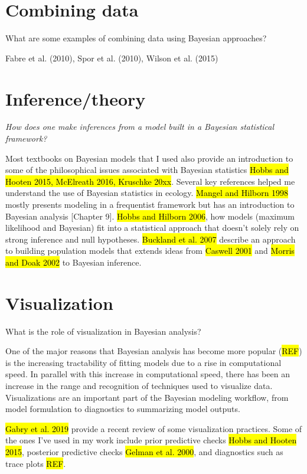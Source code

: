 \documentclass[12pt, oneside, titlepage]{article}   	%
\begin{document}
\section*{Combining data}

What are some examples of combining data using Bayesian approaches?

Fabre et al. (2010), Spor et al. (2010), Wilson et al. (2015)


\section*{Inference/theory}

\textit{How does one make inferences from a model built in a Bayesian statistical framework?}

Most textbooks on Bayesian models that I used also provide an introduction to some of the philosophical issues associated with Bayesian statistics \hl{Hobbs and Hooten 2015, McElreath 2016, Kruschke 20xx}. Several key references helped me understand the use of Bayesian statistics in ecology. \hl{Mangel and Hilborn 1998} mostly presents modeling in a frequentist framework but has an introduction to Bayesian analysis [Chapter 9]. \hl{Hobbs and Hilborn 2006}, how models (maximum likelihood and Bayesian) fit into a statistical approach that doesn't solely rely on strong inference and null hypotheses. \hl{Buckland et al. 2007} describe an approach to building population models that extends ideas from \hl{Caswell 2001} and \hl{Morris and Doak 2002} to Bayesian inference. 

\section*{Visualization}

What is the role of visualization in Bayesian analysis? 

One of the major reasons that Bayesian analysis has become more popular (\hl{REF}) is the increasing tractability of fitting models due to a rise in computational speed. In parallel with this increase in computational speed, there has been an increase in the range and recognition of techniques used to visualize data. Visualizations are an important part of the Bayesian modeling workflow, from model formulation to diagnostics to summarizing model outputs. 

\hl{Gabry et al. 2019} provide a recent review of some visualization practices. Some of the ones I've used in my work include prior predictive checks \hl{Hobbs and Hooten 2015}, posterior predictive checks \hl{Gelman et al. 2000}, and diagnostics such as trace plots \hl{REF}.
\end{document}

